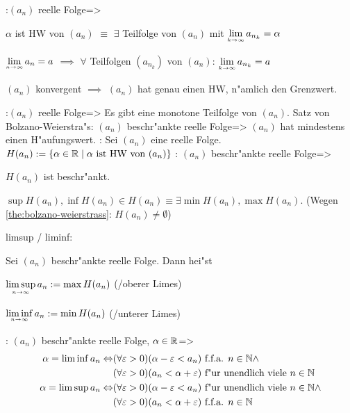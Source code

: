 \theorem:$(a_n)$ reelle Folge=>{
  \begin{stmts}
    \item $\alpha$ ist HW von $(a_n)$ $\equiv$
      $\exists$ Teilfolge von $(a_n)$ mit $\limes k->\infty a_{n_k}=\alpha$\\
    \item $\limn a_n=a$ $\implies$
      $\forall$ Teilfolgen $(a_{n_k})$ von $(a_n)$:
      $\limes k->\infty a_{n_k}=a$\\
    \item $(a_n)$ konvergent $\implies$ $(a_n)$ hat genau einen HW, n"amlich
      den Grenzwert.
    \end{stmts}  
  }
\theorem:$(a_n)$ reelle Folge=>{
  Es gibt eine monotone Teilfolge von $(a_n)$.
}
\theorem Satz von Bolzano-Weierstra"s:
  $(a_n)$ beschr"ankte reelle Folge=>{
  \label{the:bolzano-weierstrass}
  $(a_n)$ hat mindestens einen H"aufungswert.
  }
:{
  Sei $(a_n)$ eine reelle Folge.
  $H(a_n):=\left\{\alpha\in\mathbb R\mid\alpha\text{ ist HW von $(a_n)$} \right\}$
}
\theorem:
  $(a_n)$ beschr"ankte reelle Folge=>{
  \begin{stmts}
    \item $H(a_n)$ ist beschr"ankt.
    \item $\sup H(a_n),\inf H(a_n)\in H(a_n)\equiv\exists\min H(a_n),\max H(a_n)$.
      (Wegen \ref{the:bolzano-weierstrass}: $H(a_n)\ne\emptyset$)
    \end{stmts}
  }
 limsup / liminf:{
  Sei $(a_n)$ beschr"ankte reelle Folge. Dann hei"st
  \begin{stmts}
    \item $\limsupn a_n := \max H(a_n)$ (/oberer Limes)
    \item $\liminfn a_n := \min H(a_n)$ (/unterer Limes)
    \end{stmts}
  }
\theorem:
  $(a_n)$ beschr"ankte reelle Folge, $\alpha\in\mathbb R$=>{
  \begin{align*}
    \alpha=\liminf a_n \Leftrightarrow
    & (\forall \varepsilon>0)(\alpha-\varepsilon<a_n) \text{ f.f.a. } n\in\mathbb N\land \\
    & (\forall \varepsilon>0)(a_n<\alpha+\varepsilon) \text{ f"ur unendlich viele } n\in\mathbb N \\
    \alpha=\limsup a_n \Leftrightarrow
    & (\forall \varepsilon>0)(\alpha-\varepsilon<a_n) \text{ f"ur unendlich viele } n\in\mathbb N\land \\
    & (\forall \varepsilon>0)(a_n<\alpha+\varepsilon) \text{ f.f.a. } n\in\mathbb N 
    \end{align*}
  }
